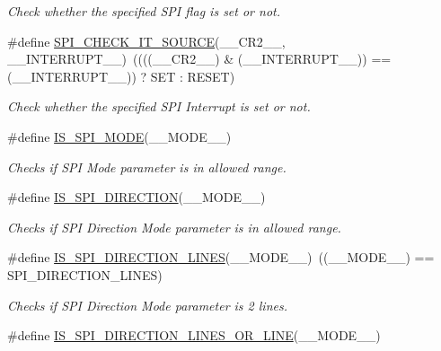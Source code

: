 \begin{DoxyCompactItemize}
\begin{DoxyCompactList}\small\item\em Check whether the specified S\+PI flag is set or not. \end{DoxyCompactList}\item 
\#define \mbox{\hyperlink{group___s_p_i___private___macros_ga8ab087388d8930531498165ac8f066a2}{S\+P\+I\+\_\+\+C\+H\+E\+C\+K\+\_\+\+I\+T\+\_\+\+S\+O\+U\+R\+CE}}(\+\_\+\+\_\+\+C\+R2\+\_\+\+\_\+,  \+\_\+\+\_\+\+I\+N\+T\+E\+R\+R\+U\+P\+T\+\_\+\+\_\+)~((((\+\_\+\+\_\+\+C\+R2\+\_\+\+\_\+) \& (\+\_\+\+\_\+\+I\+N\+T\+E\+R\+R\+U\+P\+T\+\_\+\+\_\+)) == (\+\_\+\+\_\+\+I\+N\+T\+E\+R\+R\+U\+P\+T\+\_\+\+\_\+)) ? S\+ET \+: R\+E\+S\+ET)
\begin{DoxyCompactList}\small\item\em Check whether the specified S\+PI Interrupt is set or not. \end{DoxyCompactList}\item 
\#define \mbox{\hyperlink{group___s_p_i___private___macros_ga3dd95189a3729f12ca354b757519ca01}{I\+S\+\_\+\+S\+P\+I\+\_\+\+M\+O\+DE}}(\+\_\+\+\_\+\+M\+O\+D\+E\+\_\+\+\_\+)
\begin{DoxyCompactList}\small\item\em Checks if S\+PI Mode parameter is in allowed range. \end{DoxyCompactList}\item 
\#define \mbox{\hyperlink{group___s_p_i___private___macros_ga6c66285d42fc3baf5ecaceadb54ee42a}{I\+S\+\_\+\+S\+P\+I\+\_\+\+D\+I\+R\+E\+C\+T\+I\+ON}}(\+\_\+\+\_\+\+M\+O\+D\+E\+\_\+\+\_\+)
\begin{DoxyCompactList}\small\item\em Checks if S\+PI Direction Mode parameter is in allowed range. \end{DoxyCompactList}\item 
\#define \mbox{\hyperlink{group___s_p_i___private___macros_gaff84471ab30ddd79cefd0c43dfe628c8}{I\+S\+\_\+\+S\+P\+I\+\_\+\+D\+I\+R\+E\+C\+T\+I\+O\+N\+\_\+L\+I\+N\+ES}}(\+\_\+\+\_\+\+M\+O\+D\+E\+\_\+\+\_\+)~((\+\_\+\+\_\+\+M\+O\+D\+E\+\_\+\+\_\+) == S\+P\+I\+\_\+\+D\+I\+R\+E\+C\+T\+I\+O\+N\+\_\+L\+I\+N\+ES)
\begin{DoxyCompactList}\small\item\em Checks if S\+PI Direction Mode parameter is 2 lines. \end{DoxyCompactList}\item 
\#define \mbox{\hyperlink{group___s_p_i___private___macros_ga525d9decc1251ec9037bd3c66c0e3a8c}{I\+S\+\_\+\+S\+P\+I\+\_\+\+D\+I\+R\+E\+C\+T\+I\+O\+N\+\_\+L\+I\+N\+E\+S\+\_\+\+O\+R\+\_\+L\+I\+NE}}(\+\_\+\+\_\+\+M\+O\+D\+E\+\_\+\+\_\+)

\end{DoxyCompactItemize}
